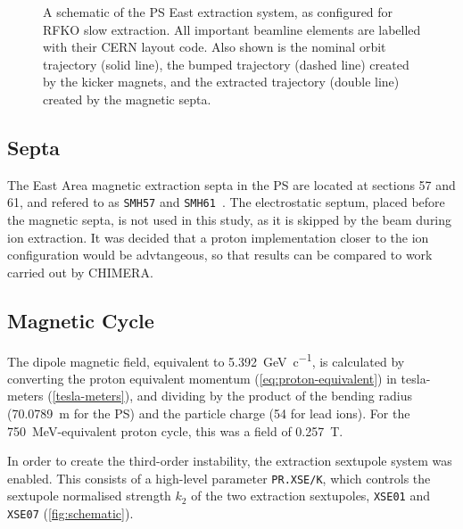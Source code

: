 \documentclass[11pt]{report}
\begin{document}
\begin{figure}
  \caption{A schematic of the PS East extraction system, as configured for RFKO slow extraction. All important beamline elements are labelled with their CERN layout code. Also shown is the nominal orbit trajectory (solid line), the bumped trajectory (dashed line) created by the kicker magnets, and the extracted trajectory (double line) created by the magnetic septa.}\label{fig:schematic}
\end{figure}

\subsection{Septa}

The East Area magnetic extraction septa in the PS are located at sections 57 and 61, and refered to as \verb|SMH57| and \verb|SMH61|~\cite{Bernhard:east-area}. The electrostatic septum, placed before the magnetic septa, is not used in this study, as it is skipped by the beam during ion extraction. It was decided that a proton implementation closer to the ion configuration would be advtangeous, so that results can be compared to work carried out by CHIMERA.

\subsection{Magnetic Cycle}

The dipole magnetic field, equivalent to \qty[per-mode=symbol]{5.392}{\giga\electronvolt\per~c}, is calculated by converting the proton equivalent momentum (\autoref{eq:proton-equivalent}) in tesla-meters (\autoref{tesla-meters}), and dividing by the product of the bending radius (\qty{70.0789}{\meter} for the PS) and the particle charge (54 for lead ions). For the \qty{750}{\mega\electronvolt}-equivalent proton cycle, this was a field of \qty{0.257}{\tesla}.

In order to create the third-order instability, the extraction sextupole system was enabled. This consists of a high-level parameter \verb|PR.XSE/K|, which controls the sextupole normalised strength $k_2$ of the two extraction sextupoles, \verb|XSE01| and \verb|XSE07| (\autoref{fig:schematic}). 
\end{document}
